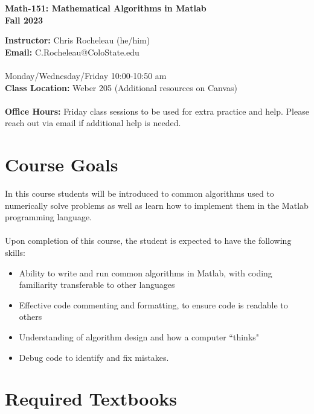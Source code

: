 \documentclass[11pt]{article}
\begin{document}
\begin{center}
\Large{\textbf{Math-151:  Mathematical Algorithms in Matlab}}\\
\textbf{Fall 2023}
\end{center}
\medskip
\textbf{Instructor:} Chris Rocheleau (he/him) \\
\textbf{Email:} C.Rocheleau@ColoState.edu\\
\\
 Monday/Wednesday/Friday 10:00-10:50 am\\
\textbf{Class Location:} Weber 205 (Additional resources on Canvas)\\
\\
\textbf{Office Hours:} Friday class sessions to be used for extra practice and help. Please reach out via email if additional help is needed.

\noindent\makebox[\linewidth]{\rule{\textwidth}{0.4pt}}


\section*{Course Goals}
\noindent In this course students will be introduced to common algorithms used to numerically solve problems as well as learn how to implement them in the Matlab programming language. \\
\\
\noindent Upon completion of this course, the student is expected to have the following skills:
\begin{itemize}
	\item Ability to write and run common algorithms in Matlab, with coding familiarity transferable to other languages
	\item Effective code commenting and formatting, to ensure code is readable to others
	\item Understanding of algorithm design and how a computer ``thinks"
	\item Debug code to identify and fix mistakes.
\end{itemize}




\section*{Required Textbooks}
\end{document}
